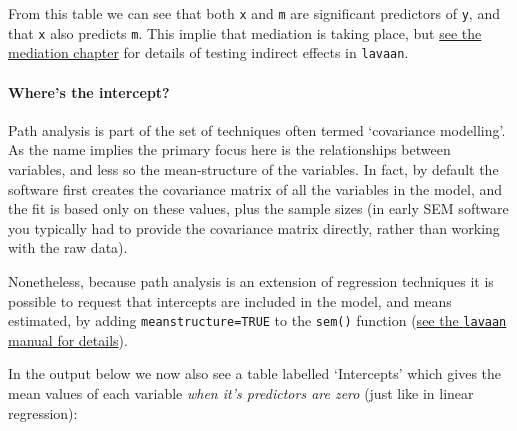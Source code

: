 \documentclass[]{article}
\let\oldparagraph\paragraph
\renewcommand{\paragraph}[1]{\oldparagraph{#1}\mbox{}}
\begin{document}
From this table we can see that both \texttt{x} and \texttt{m} are significant predictors of
\texttt{y}, and that \texttt{x} also predicts \texttt{m}. This implie that mediation is taking place,
but \protect\hyperlink{mediation}{see the mediation chapter} for details of testing indirect
effects in \texttt{lavaan}.

\hypertarget{wheres-the-intercept}{%
\paragraph{Where's the intercept?}\label{wheres-the-intercept}}

Path analysis is part of the set of techniques often termed `covariance
modelling'. As the name implies the primary focus here is the relationships
between variables, and less so the mean-structure of the variables. In fact, by
default the software first creates the covariance matrix of all the variables in
the model, and the fit is based only on these values, plus the sample sizes (in
early SEM software you typically had to provide the covariance matrix directly,
rather than working with the raw data).

Nonetheless, because path analysis is an extension of regression techniques it
is possible to request that intercepts are included in the model, and means
estimated, by adding \texttt{meanstructure=TRUE} to the \texttt{sem()} function
(\href{http://lavaan.ugent.be/tutorial/means.html}{see the \texttt{lavaan} manual for details}).

In the output below we now also see a table labelled `Intercepts' which gives
the mean values of each variable \emph{when it's predictors are zero} (just like in
linear regression):
\end{document}
